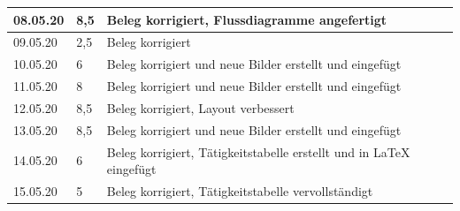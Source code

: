 \documentclass[notables, nomenclature, oneside, 150]{HSMW-Thesis}
\begin{document}
\begin{longtable}{
		|p{}
		|p{}
		|p{}|
	}
        08.05.20 & 8,5 & Beleg korrigiert, Flussdiagramme angefertigt \\ \hline
        09.05.20 & 2,5 & Beleg korrigiert \\ \hline
        10.05.20 & 6 & Beleg korrigiert und neue Bilder erstellt und eingefügt \\ \hline
        \hline
        11.05.20 & 8 & Beleg korrigiert und neue Bilder erstellt und eingefügt \\ \hline
        12.05.20 & 8,5 & Beleg korrigiert, Layout verbessert \\ \hline
        13.05.20 & 8,5 & Beleg korrigiert und neue Bilder erstellt und eingefügt \\ \hline
        14.05.20 & 6 & Beleg korrigiert, Tätigkeitstabelle erstellt und in LaTeX eingefügt \\ \hline
        15.05.20 & 5 & Beleg korrigiert, Tätigkeitstabelle vervollständigt \\ \hline
    \end{longtable}



\end{document}
